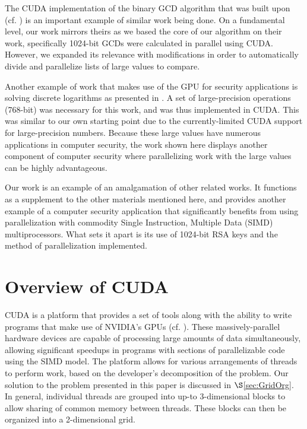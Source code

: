 \documentclass[10pt, conference]{./IEEEtran}
\begin{document}
The CUDA implementation of the binary GCD algorithm that was built upon 
(cf. \cite{fujimoto2009high}) is an important example of similar work being 
done. On a fundamental level, our work mirrors theirs as we based the core of 
our algorithm on their work, specifically 1024-bit GCDs were calculated in 
parallel using CUDA. However, we expanded its relevance with modifications in 
order to automatically divide and parallelize lists of large values to compare. 

Another example of work that makes use of the GPU for security applications is 
solving discrete logarithms as presented in \cite{henrysolving}. 
A set of large-precision operations (768-bit) was necessary for this work, and 
was thus implemented in CUDA. This was similar to our own starting point due to 
the currently-limited CUDA support for large-precision numbers. Because these 
large values have numerous applications in computer security, the work shown 
here displays another component of computer security where parallelizing work 
with the large values can be highly advantageous. 

Our work is an example of an amalgamation of other related works. It functions 
as a supplement to the other materials mentioned here, and provides another 
example of a computer security application that significantly benefits from 
using parallelization with commodity Single Instruction, Multiple Data (SIMD) 
multiprocessors. What sets it apart is its use of 1024-bit RSA keys and the 
method of parallelization implemented. 

\section{Overview of CUDA}
CUDA is a platform that provides a set of tools along with the ability to 
write programs that make use of NVIDIA's GPUs (cf. 
\cite{nvidia2012programming}). These massively-parallel hardware devices are 
capable of processing large amounts of data simultaneously, allowing 
significant speedups in programs with sections of parallelizable code using 
the SIMD model. The platform allows for various arrangements of threads to 
perform work, based on the developer's decomposition of the problem. Our 
solution to the problem presented in this paper is discussed in 
$\S$\ref{sec:GridOrg}. In general, individual threads are grouped into up-to 
3-dimensional blocks to allow sharing of common memory between threads. These 
blocks can then be organized into a 2-dimensional grid. 
\end{document}
